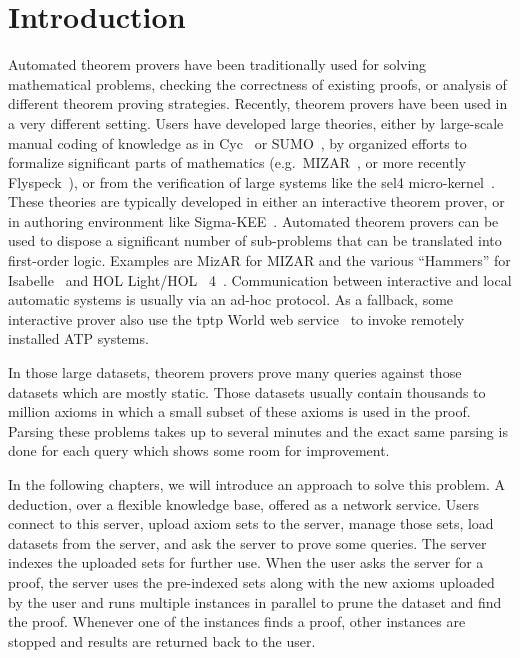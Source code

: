 \chapter{Introduction}
\label{chap:intro}

Automated theorem provers have been traditionally used for solving mathematical problems, checking the correctness of existing proofs, or analysis of different theorem proving strategies. Recently, theorem provers have been used in a very different setting. Users have developed large theories, either by large-scale manual coding of knowledge as in Cyc~\cite{RRG:CO-2005} or SUMO~\cite{PNL:AAAIWS-2002}, by organized efforts to formalize significant parts of mathematics (e.g.~MIZAR~\cite{TB:IJCAI-1985}, or more recently Flyspeck~\cite{HHMNOZ:Kepler-2011}), or from the verification of large systems like the sel4 micro-kernel~\cite{KE:SOSP-2009}. These theories are typically developed in either an interactive theorem prover, or in authoring environment like Sigma-KEE~\cite{PS:IJCAR-2014}. Automated theorem provers can be used to dispose a significant number of sub-problems that can be translated into first-order logic. Examples are MizAR for MIZAR and the various ``Hammers'' for Isabelle~\cite{MP:JAL-2007,MP:JAR-2009,BN:IJCAR-2010} and HOL Light/HOL~ 4~\cite{KU:JAR-2014,GK:CPP-2015}. Communication between interactive and local automatic systems is usually via an ad-hoc protocol. As a fallback, some interactive prover also use the \ac{tptp} World web service~\cite{Sutcliffe:LPAR-2010} to invoke remotely installed ATP systems.

In those large datasets, theorem provers prove many queries against those datasets which are mostly static. Those datasets usually contain thousands to million axioms in which a small subset of these axioms is used in the proof. Parsing these problems takes up to several minutes and the exact same parsing is done for each query which shows some room for improvement.

In the following chapters, we will introduce an approach to solve this problem. A deduction, over a flexible knowledge base, offered as a network service. Users connect to this server, upload axiom sets to the server, manage those sets, load datasets from the server, and ask the server to prove some queries. The server indexes the uploaded sets for further use. When the user asks the server for a proof, the server uses the pre-indexed sets along with the new axioms uploaded by the user and runs multiple instances in parallel to prune the dataset and find the proof. Whenever one of the instances finds a proof, other instances are stopped and results are returned back to the user.

